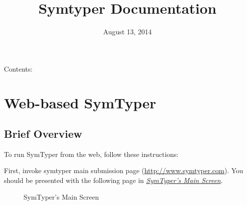 \documentclass[letterpaper,10pt,english]{sphinxmanual}
\title{Symtyper Documentation}
\date{August 13, 2014}
\author{}
\begin{document}
\maketitle
\tableofcontents
{}\label{index::doc}


Contents:


\chapter{Web-based SymTyper}
\label{Web::doc}\label{Web:welcome-to-symtyper-s-documentation}\label{Web:web-based-symtyper}

\section{Brief Overview}
\label{Web:brief-overview}
To run SymTyper from the web, follow these instructions:

First, invoke symtyper main submission page (\href{http://www.symtyper.com}{http://www.symtyper.com}). You should be presented with the following page in {\hyperref[Web:fig1]{\emph{SymTyper's Main Screen}}}.
\begin{figure}[htbp]
\centering
\capstart

\caption{SymTyper's Main Screen}\label{Web:fig1}\end{figure}
\end{document}
